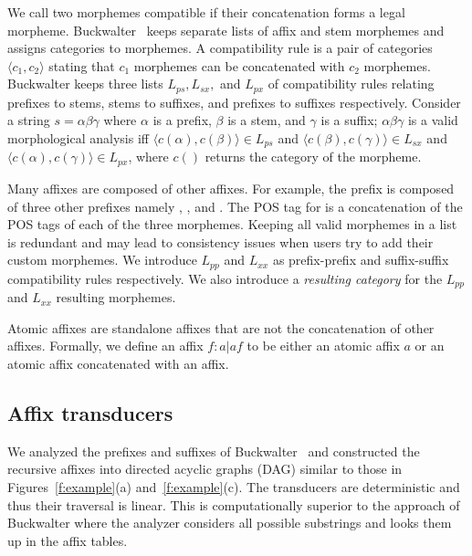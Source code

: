 \documentclass[11pt]{article}
\begin{document}
We call two morphemes compatible if their concatenation
forms a legal morpheme. 
Buckwalter~ keeps separate lists 
of affix and stem morphemes and assigns categories to
morphemes. 
A compatibility rule is a pair of categories 
$\langle c_1, c_2\rangle$  stating that $c_1$ morphemes
can be concatenated with $c_2$ morphemes.
Buckwalter keeps three lists $L_{ps}, L_{sx},$ and $L_{px}$ 
of compatibility rules relating
prefixes to stems, stems to suffixes, and prefixes to suffixes
respectively. 
Consider a string $s=\alpha\beta\gamma$ where $\alpha$ is 
a prefix, $\beta$ is a stem, and $\gamma$ is a suffix;
$\alpha\beta\gamma$ is a 
valid morphological analysis iff
$\langle c(\alpha),c(\beta)\rangle \in L_{ps}$ and
$\langle c(\beta),c(\gamma)\rangle \in L_{sx}$ and
$\langle c(\alpha),c(\gamma)\rangle \in L_{px}$, where
$c()$ returns the category of the morpheme.

Many affixes are composed of other affixes. For example,
the prefix  is composed of three other prefixes
namely , , and .
The POS tag for  is a concatenation
of the POS tags of each of the three morphemes. 
Keeping all valid morphemes in a list
is redundant and may lead to consistency issues when
users try to add their custom morphemes.
We introduce $L_{pp}$ and
$L_{xx}$ as prefix-prefix and suffix-suffix 
compatibility rules respectively.
We also introduce a {\em resulting category}
for the $L_{pp}$ and  $L_{xx}$ resulting morphemes.

Atomic affixes are standalone affixes
that are not the concatenation of other affixes. 
Formally, we define an affix $f: a | a f$ to be either
an atomic affix $a$ or an atomic affix concatenated
with an affix. 

\subsection{Affix transducers}
\label{sec:affixFSA}

We analyzed the prefixes and suffixes of 
Buckwalter~
and constructed the recursive affixes
into directed acyclic graphs (DAG) similar to 
those in Figures~\ref{f:example}(a) and~\ref{f:example}(c).
The transducers are deterministic and thus 
their traversal is linear.
This is computationally superior to the 
approach of Buckwalter where the analyzer considers
all possible substrings %
and looks them up in the affix tables. 
\end{document}
